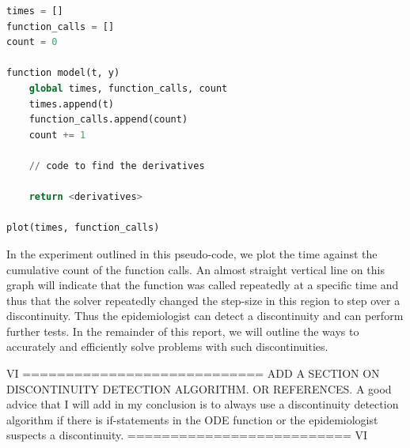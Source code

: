 \begin{minipage}{\linewidth}
\begin{lstlisting}[language=Python]
times = []
function_calls = []
count = 0

function model(t, y)
    global times, function_calls, count
    times.append(t)
    function_calls.append(count)
    count += 1	

    // code to find the derivatives
		
    return <derivatives>

plot(times, function_calls)
\end{lstlisting}
\end{minipage}

In the experiment outlined in this pseudo-code, we plot the time against the cumulative count of the function calls. An almost straight vertical line on this graph will indicate that the function was called repeatedly at a specific time and thus that the solver repeatedly changed the step-size in this region to step over a discontinuity. Thus the epidemiologist can detect a discontinuity and can perform further tests. In the remainder of this report, we will outline the ways to accurately and efficiently solve problems with such discontinuities.

VI ============================
ADD A SECTION ON DISCONTINUITY DETECTION ALGORITHM. OR REFERENCES.
A good advice that I will add in my conclusion is to always use a discontinuity detection algorithm if there is if-statements in the ODE function or the epidemiologist suspects a discontinuity.
========================== VI

